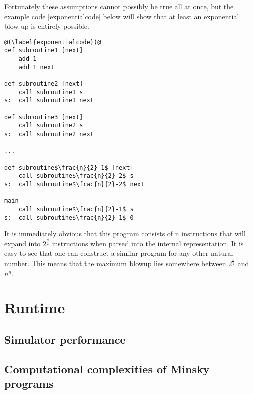 Fortunately these assumptions cannot possibly be true all at once, but the example code \ref{exponentialcode} below will show that at least an exponential blow-up is entirely possible.
\begin{lstlisting}[frame=single, caption=code resulting in exponential blow-up]
@(\label{exponentialcode})@
def subroutine1 [next]
	add 1
	add 1 next

def subroutine2 [next]
	call subroutine1 s
s:	call subroutine1 next

def subroutine3 [next]
	call subroutine2 s
s:	call subroutine2 next

...

def subroutine$\frac{n}{2}-1$ [next]
	call subroutine$\frac{n}{2}-2$ s
s:	call subroutine$\frac{n}{2}-2$ next

main
	call subroutine$\frac{n}{2}-1$ s
s:	call subroutine$\frac{n}{2}-1$ 0
\end{lstlisting}
It is immediately obvious that this program consists of n instructions that will expand into $2^{\frac{n}{2}}$ instructions when parsed into the internal representation. It is easy to see that one can construct a similar program for any other natural number.
This means that the maximum blowup lies somewhere between $2^{\frac{n}{2}}$ and $n^{n}$.
\section{Runtime}
\subsection{Simulator performance}
\subsection{Computational complexities of Minsky programs}
